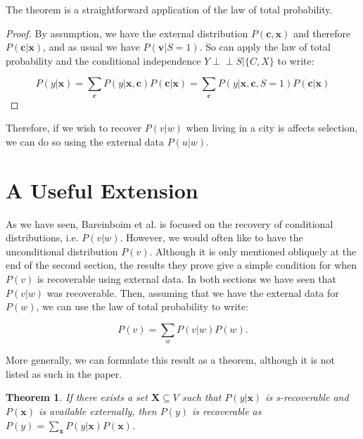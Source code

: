 \documentclass[12pt]{article}
\newtheorem{theorem}{Theorem}
\theoremstyle{definition}
\newcommand{\dsep}{\perp \!\!\!\perp}
\begin{document}
The theorem is a straightforward application of the law of total probability.
\begin{proof}
By assumption, we have the external distribution $P(\mathbf{c}, \mathbf{x})$ and therefore $P(\mathbf{c} | \mathbf{x})$, and as usual we have $P(\mathbf{v} | S =  1)$. So can apply the law of total probability and the conditional independence $Y \dsep S | \{C,X\}$ to write:

$$P(y | \mathbf{x}) = \sum_{\mathbf{c}} P(y | \mathbf{x}, \mathbf{c}) P(\mathbf{c} | \mathbf{x}) = \sum_{\mathbf{c}} P(y | \mathbf{x}, \mathbf{c}, S = 1) P(\mathbf{c} | \mathbf{x})$$

\end{proof}

Therefore, if we wish to recover $P(v | w)$ when living in a city is affects selection, we can do so using the external data $P(u | w)$.

\section{A Useful Extension}
As we have seen, Bareinboim et al. is focused on the recovery of conditional distributions, i.e. $P(v|w)$. However, we would often like to have the unconditional distribution $P(v)$. Although it is only mentioned obliquely at the end of the second section, the results they prove give a simple condition for when $P(v)$ is recoverable using external data. In both sections we have seen that $P(v|w)$ was recoverable. Then, assuming that we have the external data for $P(w)$, we can use the law of total probability to write:

$$P(v) = \sum_{w} P(v|w)P(w).$$

More generally, we can formulate this result as a theorem, although it is not listed as such in the paper.

\begin{theorem}
If there exists a set $\mathbf{X} \subseteq V$ such that $P(y|\mathbf{x})$ is s-recoverable and $P(\mathbf{x})$ is available externally, then $P(y)$ is recoverable as $P(y) = \sum_{\mathbf{x}} P(y|\mathbf{x})P(\mathbf{x})$.
\end{theorem}
\end{document}

